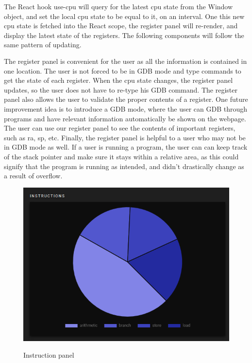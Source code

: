 The React hook use-cpu will query for the latest cpu state from the Window object, and set the local
cpu state to be equal to it, on an interval. One this new cpu state is fetched into the React scope,
the register panel will re-render, and display the latest state of the registers. The following components
will follow the same pattern of updating.

The register panel is convenient for the user as all the information is contained in one location. The user
is not forced to be in GDB mode and type commands to get the state of each register. When the cpu state changes,
the register panel updates, so the user does not have to re-type his GDB command. The register panel also
allows the user to validate the proper contents of a register. One future improvement idea is to introduce
a GDB mode, where the user can GDB through programs and have relevant information automatically be
shown on the webpage. The user can use our register panel to see the contents of important registers, such
as ra, sp, etc. Finally, the register panel is helpful to a user who may not be in GDB mode as well.
If a user is running a program, the user can can keep track of the stack pointer and make sure it stays
within a relative area, as this could signify that the program is running as intended, and didn't drastically
change as a result of overflow.

\begin{figure}[H]
  \includegraphics[scale=.4]{inst}
  \label{fig:inst}
  \caption{Instruction panel}
  \centering
\end{figure}

